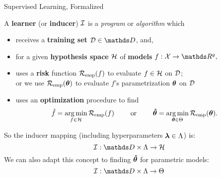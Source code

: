 \documentclass[11pt,compress,t,notes=noshow, xcolor=table]{beamer}
\begin{document}
\begin{vbframe}{Supervised Learning, Formalized}
  
  A \textbf{learner} (or \textbf{inducer}) $\mathcal{I}$ is a \emph{program} or 
  \emph{algorithm} which
  
  \begin{itemize}
    
    \item receives a \textbf{training set} $\D \in \allDatasets$, and,
    
    \item for a given \textbf{hypothesis space} $\mathcal{H}$ of \textbf{models} 
    $f:\Xspace \rightarrow \R^g,$ 
    
    \item uses a \textbf{risk} function $\mathcal{R}_{\text{emp}}(f)$ to evaluate $f \in \mathcal{H}$ on $\mathcal{D}$;\\ 
    or we use $\mathcal{R}_{\text{emp}}(\bm{\theta})$ to evaluate $f$'s parametrization $\bm{\theta}$ on $\mathcal{D}$
    
    \item uses an \textbf{optimization} procedure to find
    $$\hat{f} = \mathop{\mathrm{arg\,min}}_{f \in \mathcal{H}} \mathcal{R}_{\text{emp}}(f) \qquad \text{ or } \qquad \bm{\hat\theta} = \mathop{\mathrm{arg\,min}}_{\bm{\theta} \in \Theta} \mathcal{R}_{\text{emp}}(\bm{\theta}).$$
    
  \end{itemize}
  So the inducer mapping (including hyperparameters $\bm{\lambda} \in \Lambda$) is:
\[\ind: \preimageInducerShort\rightarrow \Hspace\]
  We can also adapt this concept to finding $\bm{\hat\theta}$ for parametric
  models:
\[\ind: \preimageInducerShort \rightarrow \Theta\]
  
  
  
  
  
  
\end{vbframe}



\end{document}
